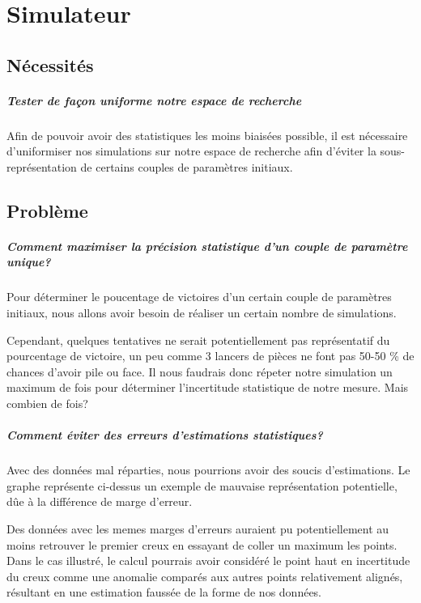 \chapter{Simulateur}

	\section{Nécessités}
	
		\paragraph{Tester de façon uniforme notre espace de recherche}
		Afin de pouvoir avoir des statistiques les moins biaisées possible, il est nécessaire d'uniformiser nos simulations sur notre espace de recherche afin d'éviter la sous-représentation de certains couples de paramètres initiaux.
 
	
	\section{Problème}
		\paragraph{Comment maximiser la précision statistique d'un couple de paramètre unique?}
		Pour déterminer le poucentage de victoires d'un certain couple de paramètres initiaux, nous allons avoir besoin de réaliser un certain nombre de simulations. 
		
		
		Cependant, quelques tentatives ne serait potentiellement pas représentatif du pourcentage de victoire, un peu comme 3 lancers de pièces ne font pas 50-50 \% de chances d'avoir pile ou face.
		Il nous faudrais donc répeter notre simulation un maximum de fois pour déterminer l'incertitude statistique de notre mesure. Mais combien de fois?
		\paragraph{Comment éviter des erreurs d'estimations statistiques?}
		Avec des données mal réparties, nous pourrions avoir des soucis d'estimations. 
		Le graphe représente ci-dessus un exemple de mauvaise représentation potentielle, dûe à la différence de marge d'erreur.
		
		Des données avec les memes marges d'erreurs auraient pu potentiellement au moins retrouver le premier creux en essayant de coller un maximum les points.
		Dans le cas illustré, le calcul pourrais avoir considéré le point haut en incertitude du creux comme une anomalie comparés aux autres points relativement alignés, résultant en une estimation faussée de la forme de nos données.
		
